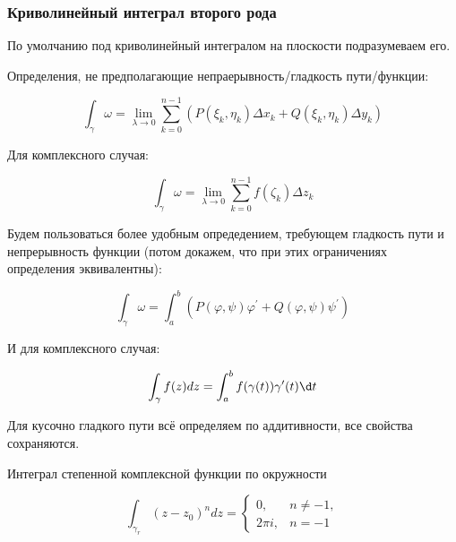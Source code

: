 \documentclass[12pt, a4paper, oneside]{memoir}
\begin{document}
\subsubsection{Криволинейный интеграл \textbf{второго} рода}

По умолчанию под криволинейный интегралом на плоскости подразумеваем его.

Определения, не предполагающие непраерывность/гладкость пути/функции:

\begin{equation}
    \int_\gamma \omega=\lim _{\lambda \rightarrow 0} \sum_{k=0}^{n-1}\left(P\left(\xi_k, \eta_k\right) \Delta x_k+Q\left(\xi_k, \eta_k\right) \Delta y_k\right)
\end{equation}

Для комплексного случая: 

\begin{equation}
    \int_\gamma \omega=\lim _{\lambda \rightarrow 0} \sum_{k=0}^{n-1} f\left(\zeta_k\right) \Delta z_k
\end{equation}


Будем пользоваться более удобным опредедением, требующем гладкость пути и непрерывность функции 
(потом докажем, что при этих ограничениях определения эквивалентны):

\begin{equation}
    \int_\gamma \omega=\int_a^b\left(P(\varphi, \psi) \varphi^{\prime}+Q(\varphi, \psi) \psi^{\prime}\right)
\end{equation}

И для комплексного случая:

\begin{equation}
    \int_\gamma f(z) d z=\int_a^b f(\gamma(t)) \gamma^{\prime}(t) \d t
\end{equation}

\begin{remark}
    Для кусочно гладкого пути всё определяем по аддитивности, все свойства сохраняются.
\end{remark}


\begin{example}
    Интеграл степенной комплексной функции по окружности
    
    \begin{equation}
        \int_{\gamma_r}\left(z-z_0\right)^n d z = \begin{cases} 0, & n \neq-1, \\ 2 \pi i, & n=-1 \end{cases}
    \end{equation}
\end{example}
\end{document}
